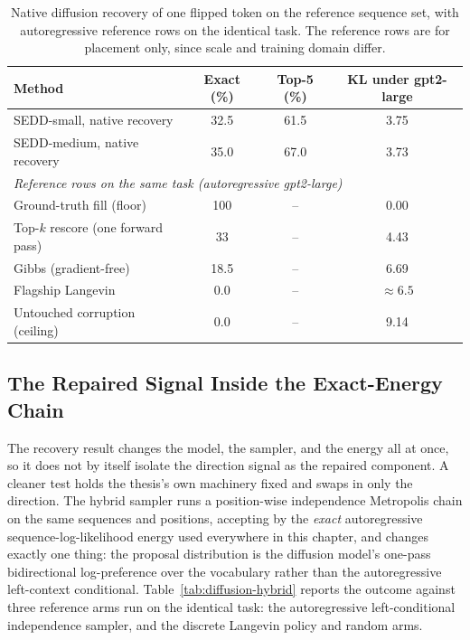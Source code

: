 \begin{table}[h]
    \centering
    \small
    \setlength{\tabcolsep}{4pt}
    \begin{tabular}{lccc}
        \toprule
        Method & Exact (\%) & Top-5 (\%) & KL under gpt2-large \\
        \midrule
        SEDD-small, native recovery & 32.5 & 61.5 & 3.75 \\
        SEDD-medium, native recovery & 35.0 & 67.0 & 3.73 \\
        \midrule
        \multicolumn{4}{l}{\emph{Reference rows on the same task (autoregressive gpt2-large)}} \\
        Ground-truth fill (floor) & 100 & -- & 0.00 \\
        Top-$k$ rescore (one forward pass) & 33 & -- & 4.43 \\
        Gibbs (gradient-free) & 18.5 & -- & 6.69 \\
        Flagship Langevin & 0.0 & -- & $\approx 6.5$ \\
        Untouched corruption (ceiling) & 0.0 & -- & 9.14 \\
        \bottomrule
    \end{tabular}
    \caption[Native diffusion recovery of one flipped token.]{Native diffusion recovery of one flipped token on the reference sequence set, with autoregressive reference rows on the identical task. The reference rows are for placement only, since scale and training domain differ.}
    \label{tab:diffusion-recovery}
\end{table}

\subsection{The Repaired Signal Inside the Exact-Energy Chain}
\label{sec:results-diffusion-hybrid}

The recovery result changes the model, the sampler, and the energy all at once, so it does not by itself isolate the direction signal as the repaired component. A cleaner test holds the thesis's own machinery fixed and swaps in only the direction. The hybrid sampler runs a position-wise independence Metropolis chain on the same sequences and positions, accepting by the \emph{exact} autoregressive sequence-log-likelihood energy used everywhere in this chapter, and changes exactly one thing: the proposal distribution is the diffusion model's one-pass bidirectional log-preference over the vocabulary rather than the autoregressive left-context conditional. Table~\ref{tab:diffusion-hybrid} reports the outcome against three reference arms run on the identical task: the autoregressive left-conditional independence sampler, and the discrete Langevin policy and random arms.

